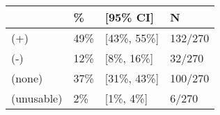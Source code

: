 \begin{tabular}{llll}
\hline
 & \% & [95\% CI]  & N \\
\hline
(+) & 49\% & [43\%, 55\%] & 132/270\\
(-) & 12\% & [8\%, 16\%] & 32/270\\
(none) & 37\% & [31\%, 43\%] & 100/270\\
(unusable) & 2\% & [1\%, 4\%] & 6/270\\
\hline
\end{tabular}
